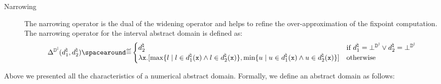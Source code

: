 \begin{description}
\item[Narrowing]
  The narrowing operator is the dual of the widening operator and helps to refine the over-approximation of the fixpoint computation.
  The narrowing operator for the interval abstract domain is defined as:
  \begin{align*}
    \intervalabstractdomainnarrowing(\defabstractvalue_1, \defabstractvalue_2) \DefeQ \begin{cases}
      \defabstractvalue_2 & \text{if } \defabstractvalue_1 = \intervalabstractdomainbottom \lor \defabstractvalue_2 = \intervalabstractdomainbottom \\
      \lambda \defvariable.\interval{\max\setdef{l}{l\in\defabstractvalue_1(\defvariable) \land l\in\defabstractvalue_2(\defvariable)}}{\min\setdef{u}{u\in\defabstractvalue_1(\defvariable) \land u\in\defabstractvalue_2(\defvariable)}} & \text{otherwise}
    \end{cases}
  \end{align*}
  \end{description}

Above we presented all the characteristics of a numerical abstract domain. Formally, we define an abstract domain as follows:

